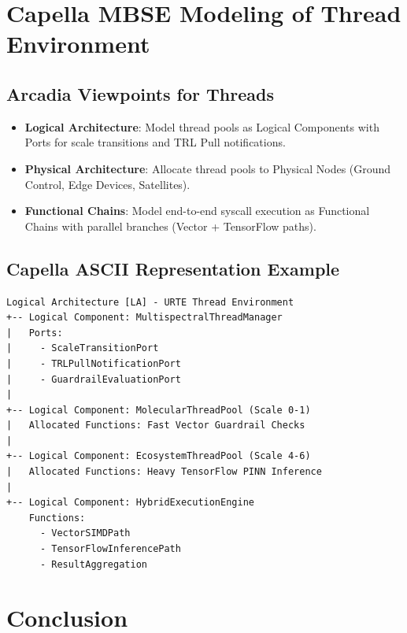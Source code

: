 \documentclass[11pt,a4paper]{report}
\begin{document}
\chapter{Capella MBSE Modeling of Thread Environment}

\section{Arcadia Viewpoints for Threads}

\begin{itemize}
    \item \textbf{Logical Architecture}: Model thread pools as Logical Components with Ports for scale transitions and TRL Pull notifications.
    \item \textbf{Physical Architecture}: Allocate thread pools to Physical Nodes (Ground Control, Edge Devices, Satellites).
    \item \textbf{Functional Chains}: Model end-to-end syscall execution as Functional Chains with parallel branches (Vector + TensorFlow paths).
\end{itemize}

\section{Capella ASCII Representation Example}

\begin{lstlisting}[style=kernelschema, caption={Capella Logical Architecture - Thread Pools}]
Logical Architecture [LA] - URTE Thread Environment
+-- Logical Component: MultispectralThreadManager
|   Ports:
|     - ScaleTransitionPort
|     - TRLPullNotificationPort
|     - GuardrailEvaluationPort
|
+-- Logical Component: MolecularThreadPool (Scale 0-1)
|   Allocated Functions: Fast Vector Guardrail Checks
|
+-- Logical Component: EcosystemThreadPool (Scale 4-6)
|   Allocated Functions: Heavy TensorFlow PINN Inference
|
+-- Logical Component: HybridExecutionEngine
    Functions:
      - VectorSIMDPath
      - TensorFlowInferencePath
      - ResultAggregation
\end{lstlisting}

\chapter{Conclusion}
\end{document}
